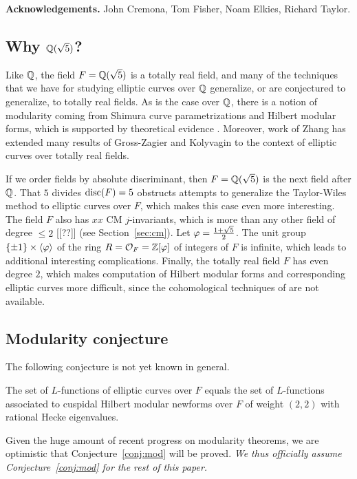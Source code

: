 \documentclass{amsart}
\begin{document}
{\bf Acknowledgements.} John Cremona, Tom Fisher, Noam Elkies, Richard Taylor.
 
\subsection{Why $\mathbb{Q}(\sqrt{5})$?}

Like $\mathbb{Q}$, the field $F=\mathbb{Q}(\sqrt{5})$ is a totally real field, and
many of the techniques that we have for studying elliptic curves over
$\mathbb{Q}$ generalize, or are conjectured to generalize, to totally real
fields.
As is the case over $\mathbb{Q}$, there is a 
notion of modularity coming from Shimura curve
parametrizations and Hilbert modular forms, which is supported by
theoretical evidence \cite{}.%
Moreover,  work \cite{zhang:heightsshimura} of Zhang has extended many results
of Gross-Zagier \cite{gross-zagier} and Kolyvagin \cite{kolyvagin:mordellweil} 
to the context of elliptic curves over totally real fields.

If we order fields by absolute discriminant, then $F=\mathbb{Q}(\sqrt{5})$ is
the next field after $\mathbb{Q}$.  That $5$ divides $\operatorname{disc}(F)=5$ obstructs
attempts to generalize the Taylor-Wiles method to elliptic curves over
$F$, which makes this case even more interesting.  The field $F$ also
has $xx$ CM $j$-invariants, which is more than any other field of
degree $\leq 2$ [[??]] (see Section~\ref{sec:cm}).  Let
$\varphi=\frac{1+\sqrt{5}}{2}$.  The unit group $\{\pm 1\} \times
\langle \varphi \rangle$ of the ring $R=\mathcal{O}_F=\mathbb{Z}[\varphi]$ of integers of
$F$ is infinite, which leads to additional interesting complications.
Finally, the totally real field $F$ has even degree $2$, which makes
computation of Hilbert modular forms and corresponding elliptic curves
more difficult, since the cohomological techniques of \cite{} are not
available.  


\subsection{Modularity conjecture}\label{sec:mod}
The following conjecture is not yet known in general. 
\begin{conjecture}[Modularity]\label{conj:mod}
  The set of $L$-functions of elliptic curves over $F$ equals the set
  of $L$-functions associated to cuspidal Hilbert modular newforms
  over $F$ of weight $(2,2)$ with rational Hecke eigenvalues.
\end{conjecture}
Given the huge amount of recent progress on modularity theorems, we
are optimistic that Conjecture~\ref{conj:mod} will be proved.  {\em We thus
officially assume Conjecture~\ref{conj:mod}  for the rest of this paper.}
\end{document}
